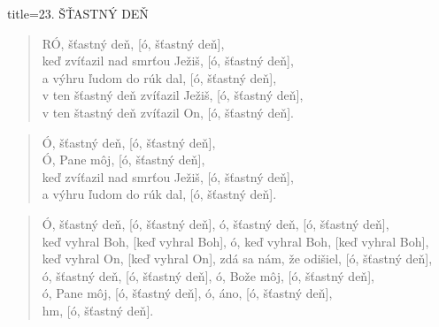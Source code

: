 \documentclass{article}
\begin{document}
\begin{song}{title={23. ŠŤASTNÝ DEŇ}}
\begin{verse}
 R\leftrepeat Ó, šťastný deň, {[}ó, šťastný deň{]},\rightrepeat \\
 keď zvíťazil nad smrťou Ježiš, [ó, šťastný deň], \\
 a výhru ľudom do rúk dal, [ó, šťastný deň], \\
 v ten šťastný deň zvíťazil Ježiš, [ó, šťastný deň], \\
 v ten štastný deň zvíťazil On, [ó, šťastný deň].
\end{verse}

\begin{verse}
   Ó, šťastný deň, [ó, šťastný deň], \\
   Ó, Pane môj, [ó, šťastný deň], \\
   keď zvíťazil nad smrťou Ježiš, [ó, šťastný deň], \\
   a výhru ľudom do rúk dal, [ó, šťastný deň].
\end{verse}

\begin{verse}
   Ó, šťastný deň, [ó, šťastný deň], ó, šťastný deň, [ó, šťastný deň], \\
   keď vyhral Boh, [keď vyhral Boh], ó, keď vyhral Boh, [keď vyhral Boh], \\
   keď vyhral On, [keď vyhral On], zdá sa nám, že odišiel, [ó, šťastný deň], \\
   ó, šťastný deň, [ó, šťastný deň], ó, Bože môj, [ó, šťastný deň], \\
   ó, Pane môj, [ó, šťastný deň], ó, áno, [ó, šťastný deň], \\
   hm, [ó, šťastný deň].
\end{verse}

\end{song}
\end{document}
